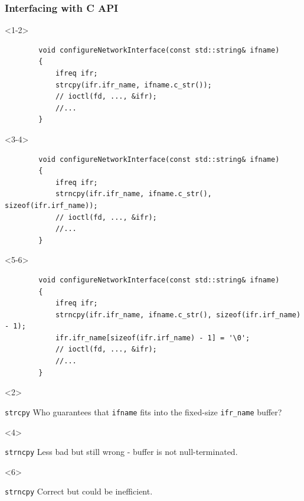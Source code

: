 \documentclass{beamer}
\begin{document}
\begin{frame}[fragile,t]
\frametitle{Interfacing with C API}
    \begin{onlyenv}<1-2>
    \begin{lstlisting}
        void configureNetworkInterface(const std::string& ifname)
        {
            ifreq ifr;
            strcpy(ifr.ifr_name, ifname.c_str());
            // ioctl(fd, ..., &ifr);
            //...
        }
    \end{lstlisting}
    \end{onlyenv}

    \begin{onlyenv}<3-4>
    \begin{lstlisting}
        void configureNetworkInterface(const std::string& ifname)
        {
            ifreq ifr;
            strncpy(ifr.ifr_name, ifname.c_str(), sizeof(ifr.irf_name));
            // ioctl(fd, ..., &ifr);
            //...
        }
    \end{lstlisting}
    \end{onlyenv}

    \begin{onlyenv}<5-6>
    \begin{lstlisting}
        void configureNetworkInterface(const std::string& ifname)
        {
            ifreq ifr;
            strncpy(ifr.ifr_name, ifname.c_str(), sizeof(ifr.irf_name) - 1);
            ifr.ifr_name[sizeof(ifr.irf_name) - 1] = '\0';
            // ioctl(fd, ..., &ifr);
            //...
        }
    \end{lstlisting}
    \end{onlyenv}

    \begin{onlyenv}<2>
    \begin{alertblock}{\texttt{strcpy}}
        Who guarantees that \texttt{ifname} fits into the fixed-size \texttt{ifr\_name} buffer?
    \end{alertblock}
    \end{onlyenv}

    \begin{onlyenv}<4>
    \begin{alertblock}{\texttt{strncpy}}
         Less bad but still wrong - buffer is not null-terminated.
    \end{alertblock}
    \end{onlyenv}

    \begin{onlyenv}<6>
    \begin{block}{\texttt{strncpy}}
        Correct but could be inefficient.
    \end{block}
    \end{onlyenv}
\end{frame}
\end{document}
